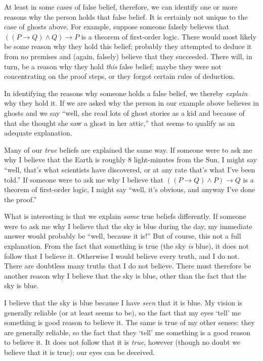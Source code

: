 \documentclass[11pt]{standalone}
\begin{document}
\begin{spacing}{1.5}
At least in some cases of false belief, therefore, we can identify one
or more reasons why the person holds that false belief.  It is
certainly not unique to the case of ghosts above.  For example,
suppose someone falsely believes that $((P \rightarrow Q ) \wedge Q)
\rightarrow P$ is a theorem of first-order logic.  There would most
likely be some reason why they hold this belief; probably they
attempted to deduce it from no premises and (again, falsely) believe
that they succeeded.  There will, in turn, be a reason why they hold
{\em this} false belief; maybe they were not concentrating on the
proof steps, or they forgot certain rules of deduction.

In identifying the reasons why someone holds a false belief, we
thereby {\em explain} why they hold it.  If we are asked why the
person in our example above believes in ghosts and we say ``well, she
read lots of ghost stories as a kid and because of that she thought
she saw a ghost in her attic,'' that seems to qualify as an adequate
explanation.

Many of our {\em true} beliefs are explained the same way.  If someone
were to ask me why I believe that the Earth is roughly 8 light-minutes
from the Sun, I might say ``well, that's what scientists have
discovered, or at any rate that's what I've been told.''  If someone
were to ask me why I believe that $((P \rightarrow Q ) \wedge P)
\rightarrow Q$ is a theorem of first-order logic, I might say ``well,
it's obvious, and anyway I've done the proof.''

What is interesting is that we explain {\em some} true beliefs
differently.  If someone were to ask me why I believe that the sky is
blue during the day, my immediate answer would probably be ``well,
because it is!''  But of course, this not a full explanation.  From
the fact that something is true (the sky {\em is} blue), it does not
follow that I believe it.  Otherwise I would believe every truth, and
I do not.  There are doubtless many truths that I do not believe.
There must therefore be another reason why I believe that the sky is
blue, other than the fact that the sky is blue.

I believe that the sky is blue because I have {\em seen} that it is
blue.  My vision is generally reliable (or at least seems to be), so
the fact that my eyes `tell' me something is good reason to believe
it.  The same is true of my other senses: they are generally reliable,
so the fact that they `tell' me something is a good reason to believe
it.  It does not follow that it is {\em true}, however (though no
doubt we believe that it is true); our eyes can be deceived.  


\end{spacing}
\end{document}
